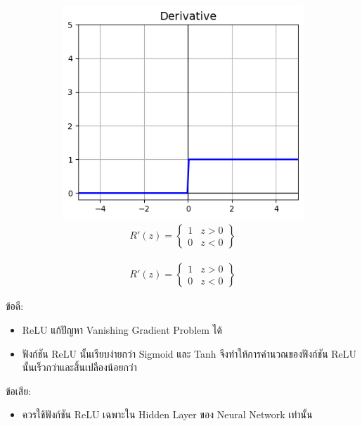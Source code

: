 \begin{itemize}
\begin{figure}[H]
\begin{subfigure}{0.5\textwidth}
                  \includegraphics[width=0.9\linewidth]{fig/actfunc_relu_der.png}
                  \caption{%
                      \begin{equation}
                          \begin{split}R'(z) =
                              \begin{Bmatrix}
                                  1 & z>0 \\
                                  0 & z<0
                              \end{Bmatrix}
                          \end{split}
                      \end{equation}
                  }
                  \label{fig:actfunc_relu_der}
              \end{subfigure}
          \end{figure}

          ข้อดี:
          \begin{itemize}
              \item ReLU แก้ปัญหา Vanishing Gradient Problem ได้

              \item ฟังก์ชัน ReLU นั้นเรียบง่ายกว่า Sigmoid และ Tanh จึงทำให้การคำนวณของฟังก์ชัน ReLU นั้นเร็วกว่าและสิ้นเปลืองน้อยกว่า
          \end{itemize}
          ข้อเสีย:
          \begin{itemize}
              \item ควรใช้ฟังก์ชัน ReLU เฉพาะใน Hidden Layer ของ Neural Network เท่านั้น


\end{itemize}
\end{itemize}
